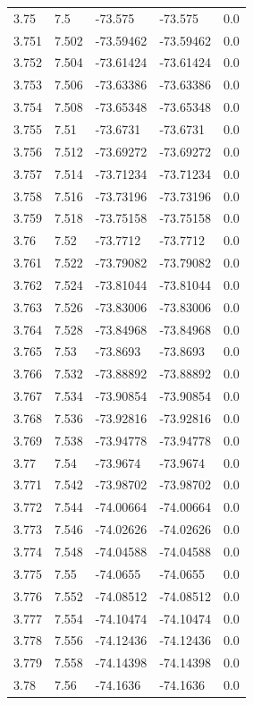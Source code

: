 \begin{tabular}{lllll}
3.75 & 7.5 & -73.575 & -73.575 & 0.0 \\
3.751 & 7.502 & -73.59462 & -73.59462 & 0.0 \\
3.752 & 7.504 & -73.61424 & -73.61424 & 0.0 \\
3.753 & 7.506 & -73.63386 & -73.63386 & 0.0 \\
3.754 & 7.508 & -73.65348 & -73.65348 & 0.0 \\
3.755 & 7.51 & -73.6731 & -73.6731 & 0.0 \\
3.756 & 7.512 & -73.69272 & -73.69272 & 0.0 \\
3.757 & 7.514 & -73.71234 & -73.71234 & 0.0 \\
3.758 & 7.516 & -73.73196 & -73.73196 & 0.0 \\
3.759 & 7.518 & -73.75158 & -73.75158 & 0.0 \\
3.76 & 7.52 & -73.7712 & -73.7712 & 0.0 \\
3.761 & 7.522 & -73.79082 & -73.79082 & 0.0 \\
3.762 & 7.524 & -73.81044 & -73.81044 & 0.0 \\
3.763 & 7.526 & -73.83006 & -73.83006 & 0.0 \\
3.764 & 7.528 & -73.84968 & -73.84968 & 0.0 \\
3.765 & 7.53 & -73.8693 & -73.8693 & 0.0 \\
3.766 & 7.532 & -73.88892 & -73.88892 & 0.0 \\
3.767 & 7.534 & -73.90854 & -73.90854 & 0.0 \\
3.768 & 7.536 & -73.92816 & -73.92816 & 0.0 \\
3.769 & 7.538 & -73.94778 & -73.94778 & 0.0 \\
3.77 & 7.54 & -73.9674 & -73.9674 & 0.0 \\
3.771 & 7.542 & -73.98702 & -73.98702 & 0.0 \\
3.772 & 7.544 & -74.00664 & -74.00664 & 0.0 \\
3.773 & 7.546 & -74.02626 & -74.02626 & 0.0 \\
3.774 & 7.548 & -74.04588 & -74.04588 & 0.0 \\
3.775 & 7.55 & -74.0655 & -74.0655 & 0.0 \\
3.776 & 7.552 & -74.08512 & -74.08512 & 0.0 \\
3.777 & 7.554 & -74.10474 & -74.10474 & 0.0 \\
3.778 & 7.556 & -74.12436 & -74.12436 & 0.0 \\
3.779 & 7.558 & -74.14398 & -74.14398 & 0.0 \\
3.78 & 7.56 & -74.1636 & -74.1636 & 0.0 \\

\end{tabular}
